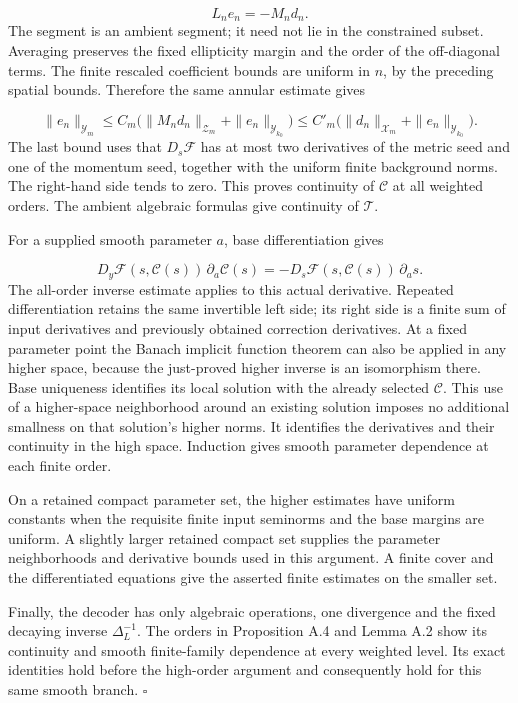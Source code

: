 \documentclass[
  english,
  11pt,
  reqno]{amsart}
\begin{document}
\label{eq:online-chart-exact-difference-equation} \[
L_ne_n=-M_nd_n.
\] The segment is an ambient segment; it need not lie in the constrained
subset. Averaging preserves the fixed ellipticity margin and the order
of the off-diagonal terms. The finite rescaled coefficient bounds are
uniform in \(n\), by the preceding spatial bounds. Therefore the same
annular estimate gives

\label{eq:online-chart-higher-difference-estimate} \[
\|e_n\|_{\mathcal Y_m}
\le C_m\bigl(\|M_nd_n\|_{\mathcal Z_m}
+\|e_n\|_{\mathcal Y_{k_0}}\bigr)
\le C'_m\bigl(\|d_n\|_{\mathcal X_m}
+\|e_n\|_{\mathcal Y_{k_0}}\bigr).
\] The last bound uses that \(D_s\mathcal F\) has at most two
derivatives of the metric seed and one of the momentum seed, together
with the uniform finite background norms. The right-hand side tends to
zero. This proves continuity of \(\mathcal C\) at all weighted orders.
The ambient algebraic formulas give continuity of \(\mathcal T\).

For a supplied smooth parameter \(a\), base differentiation gives

\label{eq:online-chart-parameter-linearization} \[
D_y\mathcal F(s,\mathcal C(s))\,\partial_a\mathcal C(s)
=-D_s\mathcal F(s,\mathcal C(s))\,\partial_a s.
\] The all-order inverse estimate applies to this actual derivative.
Repeated differentiation retains the same invertible left side; its
right side is a finite sum of input derivatives and previously obtained
correction derivatives. At a fixed parameter point the Banach implicit
function theorem can also be applied in any higher space, because the
just-proved higher inverse is an isomorphism there. Base uniqueness
identifies its local solution with the already selected \(\mathcal C\).
This use of a higher-space neighborhood around an existing solution
imposes no additional smallness on that solution's higher norms. It
identifies the derivatives and their continuity in the high space.
Induction gives smooth parameter dependence at each finite order.

On a retained compact parameter set, the higher estimates have uniform
constants when the requisite finite input seminorms and the base margins
are uniform. A slightly larger retained compact set supplies the
parameter neighborhoods and derivative bounds used in this argument. A
finite cover and the differentiated equations give the asserted finite
estimates on the smaller set.

Finally, the decoder has only algebraic operations, one divergence and
the fixed decaying inverse \(\Delta_L^{-1}\). The orders in Proposition
A.4 and Lemma A.2 show its continuity and smooth finite-family
dependence at every weighted level. Its exact identities hold before the
high-order argument and consequently hold for this same smooth branch.
\hfill\(\square\)
\end{document}
